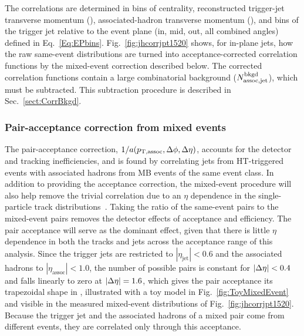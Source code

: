 The correlations are determined in bins of centrality, reconstructed trigger-jet transverse momentum (), associated-hadron transverse momentum (), and bins of the trigger jet relative to the event plane (in, mid, out, all combined angles) defined in Eq.~\ref{Eq:EPbins}.  Fig.~\ref{fig:jhcorrjpt1520} shows, for in-plane  jets, how the raw same-event distributions are turned into acceptance-corrected correlation functions by the mixed-event correction described below.  The corrected correlation functions contain a large combinatorial background ($N^{\rm bkgd}_{\rm assoc,jet}$), which must be subtracted.  This subtraction procedure is described in Sec.~\ref{sect:CorrBkgd}.



\subsubsection{Pair-acceptance correction from mixed events}
\label{sect:MixedEvents}

The pair-acceptance correction, $1 / a(p_{\mathrm{T, assoc}}, \text{\ensuremath{\Delta\phi}}, \text{\ensuremath{\Delta\eta}})$, accounts for the detector and tracking inefficiencies, and is found by correlating jets from HT-triggered events with associated hadrons from MB events of the same event class. %
%
In addition to providing the acceptance correction, the mixed-event procedure will also help remove the trivial correlation due to an $\eta$ dependence in the single-particle track distributions~\cite{PhysRevC.101.064901}.  
%
Taking the ratio of the same-event pairs to the mixed-event pairs removes the detector effects of acceptance and efficiency.  
%
The pair acceptance will serve as the dominant effect, given that there is little $\eta$ dependence in both the tracks and jets across the acceptance range of this analysis.
%
Since the trigger jets are restricted to $|\eta_\mathrm{jet}| < 0.6$ and the associated hadrons to $|\eta_\mathrm{assoc}| < 1.0$, the number of possible pairs is constant for $|\Delta\eta| < 0.4$ and falls linearly to zero at $|\Delta\eta| = 1.6$, which gives the pair acceptance its trapezoidal shape in \deta, illustrated with a toy model in Fig.~\ref{fig:ToyMixedEvent} and visible in the measured mixed-event distributions of Fig.~\ref{fig:jhcorrjpt1520}.
%
Because the trigger jet and the associated hadrons of a mixed pair come from different events, they are correlated only through this acceptance.

